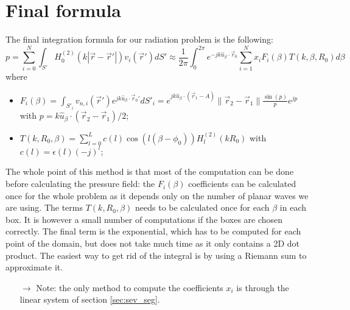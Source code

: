 \documentclass[12pt, openany]{report}
\theoremstyle{definition}
\begin{document}
\section{Final formula}
The final integration formula for our radiation problem is the following:
\begin{equation}
	p = \sum_{i=0}^N \int_{S'} H_0^{(2)} (k|\vec r-\vec r'|)v_i(\vec r')dS' \approx \frac{1}{2\pi} \int_0^{2\pi} e^{-jk\hat u_\beta \cdot \vec r_0} \sum_{i=1}^N x_i F_i(\beta) T(k,\beta,R_0)d\beta 
\end{equation}
where 
\begin{itemize}
	\item $F_i(\beta) = \int_{S'_i} v_{n,i}(\vec r') e^{jk \hat u_\beta \cdot \vec r_0'}dS'_i = e^{jk \hat u_\beta \cdot (\vec r_1- A)} \| \vec r_2-\vec r_1\| \frac{\sin(p)}{p} e^{jp}$ with $p=k\hat u_\beta \cdot (\vec r_2-\vec r_1)/2$; 
	\item $T(k, R_0, \beta) = \sum_{l=0}^L c(l) \cos(l(\beta-\phi_0)) H_l^{(2)}(kR_0)$ with $c(l) = \epsilon(l)(-j)^l$;
\end{itemize}
The whole point of this method is that most of the computation can be done before calculating the pressure field: the $F_i(\beta)$ coefficients can be calculated once for the whole problem as it depends only on the number of planar waves we are using. The terms $T(k,R_0,\beta)$ needs to be calculated once for each $\beta$ in each box. It is however a small number of computations if the boxes are chosen correctly. The final term is the exponential, which has to be computed for each point of the domain, but does not take much time as it only contains a 2D dot product. The easiest way to get rid of the integral is by using a Riemann sum to approximate it. 
\begin{itemize}
	\item [$\to$] Note: the only method to compute the coefficients $x_i$ is through the linear system of section \ref{sec:sev_seg}.
\end{itemize} 
\end{document}
